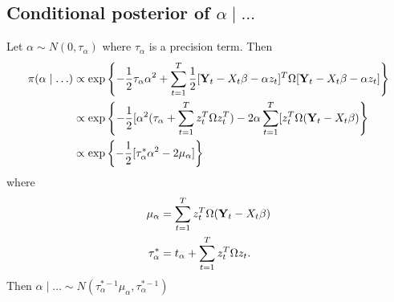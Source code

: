 \subsection*{Conditional posterior of $\alpha \mid \ldots$}\label{s:alphapost}
Let $\alpha \sim N(0, \tau_\alpha)$ where $\tau_\alpha$ is a precision term. Then
\begin{align*}
  \pi(\alpha \mid \ldots) &\propto \exp \left\{ -\frac{ 1 }{ 2 } \tau_\alpha \alpha^2 + \sum_{ t = 1 }^T \frac{ 1 }{ 2 } [\mbox{\bf Y}_t - X_t\beta - \alpha z_t]^T \Omega [\mbox{\bf Y}_t - X_t\beta - \alpha z_t] \right\} \\
      &\propto \exp \left\{ -\frac{ 1 }{ 2 } [\alpha^2(\tau_\alpha + \sum_{t = 1 }^T z_t^T \Omega z_t^T) - 2 \alpha \sum_{t=1}^T[z_t^T \Omega (\mbox{\bf Y}_t - X_t \beta) \right\}\\
      &\propto \exp \left\{ -\frac{ 1 }{ 2 } [\tau_\alpha^* \alpha^2 - 2 \mu_\alpha] \right\}
\end{align*}
where 
\begin{align*}
  \mu_\alpha &= \sum_{t = 1}^T z_t^T \Omega (\mbox{\bf Y}_t - X_t \beta)\\
  \tau_\alpha^* &= t_\alpha + \sum_{t=1}^T z_t^T \Omega z_t.
\end{align*}
Then $\alpha \mid \ldots \sim N(\tau^{*-1}_\alpha \mu_\alpha, \tau^{*-1}_\alpha) $